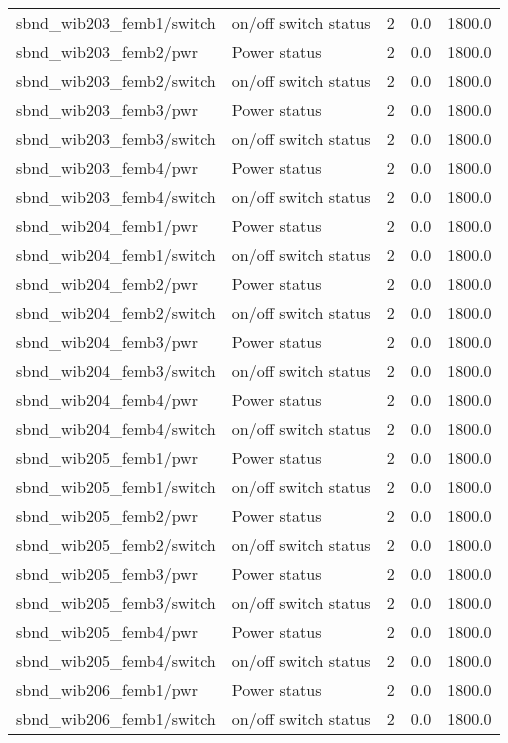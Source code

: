 \begin{center}
\begin{longtable}{l | l l l l }
sbnd\_wib203\_femb1/switch & on/off switch status & 2 & 0.0 & 1800.0\\ 
sbnd\_wib203\_femb2/pwr & Power status & 2 & 0.0 & 1800.0\\ 
sbnd\_wib203\_femb2/switch & on/off switch status & 2 & 0.0 & 1800.0\\ 
sbnd\_wib203\_femb3/pwr & Power status & 2 & 0.0 & 1800.0\\ 
sbnd\_wib203\_femb3/switch & on/off switch status & 2 & 0.0 & 1800.0\\ 
sbnd\_wib203\_femb4/pwr & Power status & 2 & 0.0 & 1800.0\\ 
sbnd\_wib203\_femb4/switch & on/off switch status & 2 & 0.0 & 1800.0\\ 
sbnd\_wib204\_femb1/pwr & Power status & 2 & 0.0 & 1800.0\\ 
sbnd\_wib204\_femb1/switch & on/off switch status & 2 & 0.0 & 1800.0\\ 
sbnd\_wib204\_femb2/pwr & Power status & 2 & 0.0 & 1800.0\\ 
sbnd\_wib204\_femb2/switch & on/off switch status & 2 & 0.0 & 1800.0\\ 
sbnd\_wib204\_femb3/pwr & Power status & 2 & 0.0 & 1800.0\\ 
sbnd\_wib204\_femb3/switch & on/off switch status & 2 & 0.0 & 1800.0\\ 
sbnd\_wib204\_femb4/pwr & Power status & 2 & 0.0 & 1800.0\\ 
sbnd\_wib204\_femb4/switch & on/off switch status & 2 & 0.0 & 1800.0\\ 
sbnd\_wib205\_femb1/pwr & Power status & 2 & 0.0 & 1800.0\\ 
sbnd\_wib205\_femb1/switch & on/off switch status & 2 & 0.0 & 1800.0\\ 
sbnd\_wib205\_femb2/pwr & Power status & 2 & 0.0 & 1800.0\\ 
sbnd\_wib205\_femb2/switch & on/off switch status & 2 & 0.0 & 1800.0\\ 
sbnd\_wib205\_femb3/pwr & Power status & 2 & 0.0 & 1800.0\\ 
sbnd\_wib205\_femb3/switch & on/off switch status & 2 & 0.0 & 1800.0\\ 
sbnd\_wib205\_femb4/pwr & Power status & 2 & 0.0 & 1800.0\\ 
sbnd\_wib205\_femb4/switch & on/off switch status & 2 & 0.0 & 1800.0\\ 
sbnd\_wib206\_femb1/pwr & Power status & 2 & 0.0 & 1800.0\\ 
sbnd\_wib206\_femb1/switch & on/off switch status & 2 & 0.0 & 1800.0\\ 

\end{longtable}
\end{center}
